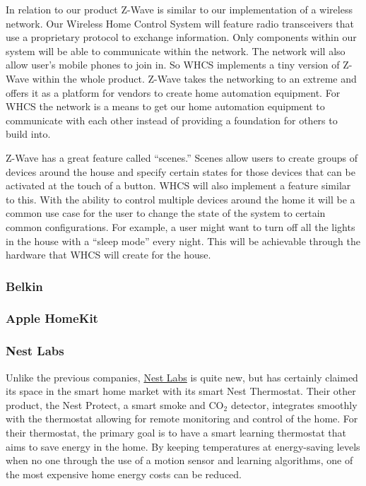 In relation to our product Z{}-Wave is similar to our
implementation of a wireless network. Our Wireless Home Control System will
feature radio transceivers that use a proprietary protocol to exchange
information. Only components within our system will be able to communicate
within the network. The network will also allow user{}'s mobile phones to join
in. So WHCS implements a tiny version of Z{}-Wave within the whole product.
Z{}-Wave takes the networking to an extreme and offers it as a platform for
vendors to create home automation equipment. For WHCS the network is a means to
get our home automation equipment to communicate with each other instead of
providing a foundation for others to build into.

{\color{black}
Z{}-Wave has a great feature called {}``scenes.'' Scenes allow users to create groups of devices around the house and
specify certain states for those devices that can be activated at the touch of a button. WHCS will also implement a
feature similar to this. With the ability to control multiple devices around the home it will be a common use case for
the user to change the state of the system to certain common configurations. For example, a user might want to turn off
all the lights in the house with a {}``sleep mode{}'' every night. This will be achievable through the hardware that
WHCS will create for the house.}

\subsubsection{Belkin}

\subsubsection{Apple HomeKit}

\subsubsection{Nest Labs}
Unlike the previous companies, \href{http://nest.com}{Nest Labs} is quite new,
but has certainly claimed its space in the smart home market with its smart
Nest Thermostat. Their other product, the Nest Protect, a smart smoke and
CO$_2$ detector, integrates smoothly with the thermostat allowing for remote
monitoring and control of the home. For their thermostat, the primary goal is
to have a smart learning thermostat that aims to save energy in the home. By
keeping temperatures at energy-saving levels when no one through the use of a
motion sensor and learning algorithms, one of the most expensive home energy
costs can be reduced.

